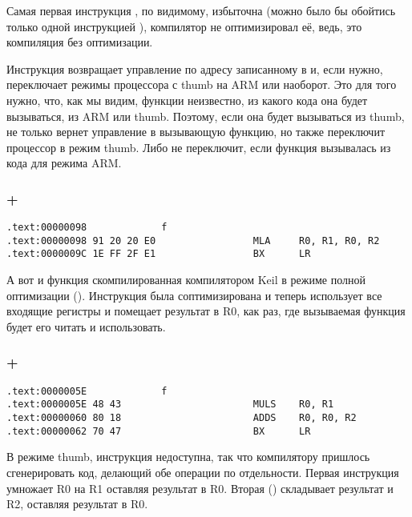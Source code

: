 Самая первая инструкция , по видимому, избыточна (можно было бы обойтись только одной инструкцией 
), компилятор не оптимизировал её, ведь, это компиляция без оптимизации.

Инструкция  возвращает управление по адресу записанному в \LR и, если нужно, переключает режимы процессора
с thumb на ARM или наоборот. Это для того нужно, что, как мы видим, функции  неизвестно, из какого кода
она будет вызываться, из ARM или thumb. Поэтому, если она будет вызываться из thumb,  не только вернет
управление в вызывающую функцию, но также переключит процессор в режим thumb. Либо не переключит, если функция
вызывалась из кода для режима ARM.

\subsubsection{\OptimizingKeil + \ARMMode}

\begin{lstlisting}
.text:00000098             f
.text:00000098 91 20 20 E0                 MLA     R0, R1, R0, R2
.text:0000009C 1E FF 2F E1                 BX      LR
\end{lstlisting}

А вот и функция  скомпилированная компилятором Keil в режиме полной оптимизации (\Othree). Инструкция \MOV была
соптимизирована и теперь  использует все входящие регистры и помещает результат в R0, как раз, где
вызываемая функция будет его читать и использовать.

\subsubsection{\OptimizingKeil + \ThumbMode}

\begin{lstlisting}
.text:0000005E             f
.text:0000005E 48 43                       MULS    R0, R1
.text:00000060 80 18                       ADDS    R0, R0, R2
.text:00000062 70 47                       BX      LR
\end{lstlisting}

В режиме thumb, инструкция  недоступна, так что компилятору пришлось сгенерировать код, делающий
обе операции по отдельности. Первая инструкция  умножает R0 на R1 оставляя результат в R0. 
Вторая () складывает результат и R2, оставляя результат в R0.

